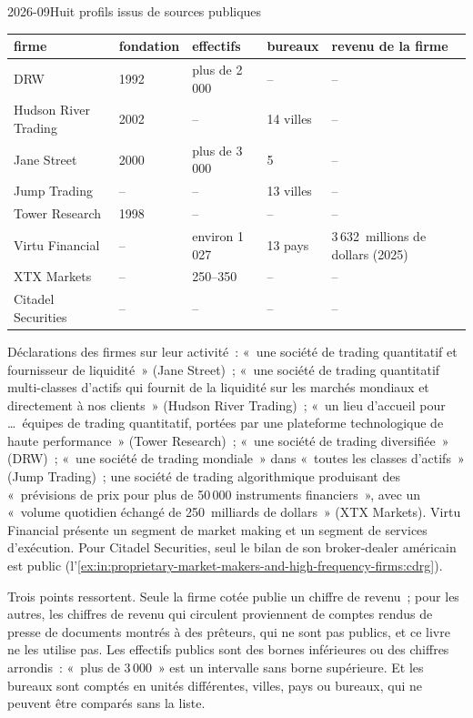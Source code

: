 \begin{dated}{2026-09}{Huit profils issus de sources publiques}\label{dat:in:proprietary-market-makers-and-high-frequency-firms:profiles}
\small
\begin{tabular}{@{}lllll@{}}
\toprule
firme & fondation & effectifs & bureaux & revenu de la firme\\
\midrule
DRW & 1992 & plus de 2\,000 & -- & --\\
Hudson River Trading & 2002 & -- & 14 villes & --\\
Jane Street & 2000 & plus de 3\,000 & 5 & --\\
Jump Trading & -- & -- & 13 villes & --\\
Tower Research & 1998 & -- & -- & --\\
Virtu Financial & -- & environ 1\,027 & 13 pays & 3\,632~millions de dollars (2025)\\
XTX Markets & -- & 250--350 & -- & --\\
Citadel Securities & -- & -- & -- & --\\
\bottomrule
\end{tabular}

\smallskip\noindent Déclarations des firmes sur leur activité~: «~une société de trading quantitatif et fournisseur de liquidité~»
(Jane Street)~; «~une société de trading quantitatif multi-classes d'actifs qui fournit de la liquidité sur les marchés mondiaux et directement
à nos clients~» (Hudson River Trading)~; «~un lieu d'accueil pour \dots\ équipes de trading quantitatif, portées par une plateforme
technologique de haute performance~» (Tower Research)~; «~une société de trading diversifiée~» (DRW)~; «~une société de trading mondiale~» dans
«~toutes les classes d'actifs~» (Jump Trading)~; une société de trading algorithmique produisant des «~prévisions de prix pour plus de 50\,000 instruments financiers~»,
avec un «~volume quotidien échangé de 250~milliards de dollars~» (XTX Markets). Virtu Financial présente un segment de market making et un segment de services d'exécution.
Pour Citadel Securities, seul le bilan de son broker-dealer américain est public
(l'\cref{ex:in:proprietary-market-makers-and-high-frequency-firms:cdrg}).
\end{dated}

Trois points ressortent. Seule la firme cotée publie un chiffre de revenu~; pour les autres, les chiffres de revenu qui circulent
proviennent de comptes rendus de presse de documents montrés à des prêteurs, qui ne sont pas publics, et ce livre ne les utilise pas. Les
effectifs publics sont des bornes inférieures ou des chiffres arrondis~: «~plus de 3\,000~» est un intervalle sans borne supérieure. Et
les bureaux sont comptés en unités différentes, villes, pays ou bureaux, qui ne peuvent être comparés sans la liste.

